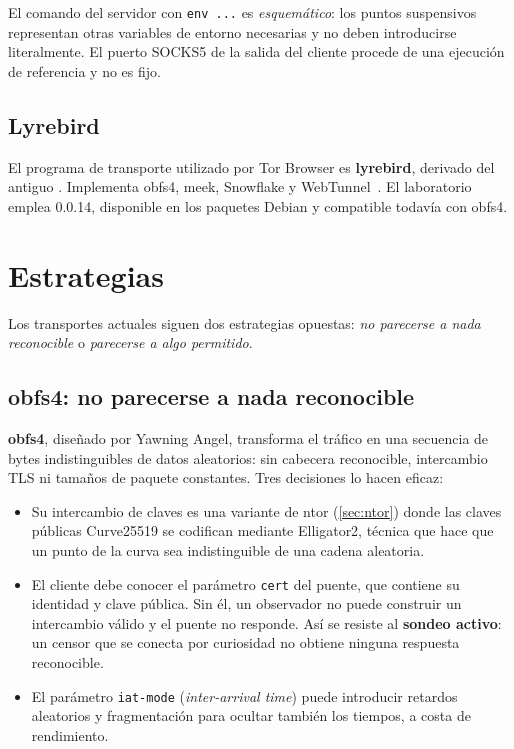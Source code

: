 El comando del servidor con \texttt{env ...} es \emph{esquemático}: los puntos suspensivos representan otras variables de entorno necesarias y no deben introducirse literalmente. El puerto SOCKS5 de la salida del cliente procede de una ejecución de referencia y no es fijo.

\subsection{Lyrebird}

El programa de transporte utilizado por Tor Browser es \textbf{lyrebird}, derivado del antiguo . Implementa obfs4, meek, Snowflake y WebTunnel~\cite{torsupport}. El laboratorio emplea  0.0.14, disponible en los paquetes Debian y compatible todavía con obfs4.

\section{Estrategias}\label{sec:cens-strategie}

Los transportes actuales siguen dos estrategias opuestas: \emph{no parecerse a nada reconocible} o \emph{parecerse a algo permitido}.

\subsection{obfs4: no parecerse a nada reconocible}

\textbf{obfs4}, diseñado por Yawning Angel, transforma el tráfico en una secuencia de bytes indistinguibles de datos aleatorios: sin cabecera reconocible, intercambio TLS ni tamaños de paquete constantes. Tres decisiones lo hacen eficaz:
\begin{itemize}
  \item Su intercambio de claves es una variante de ntor (\cref{sec:ntor}) donde las claves públicas Curve25519 se codifican mediante Elligator2, técnica que hace que un punto de la curva sea indistinguible de una cadena aleatoria.
  \item El cliente debe conocer el parámetro \texttt{cert} del puente, que contiene su identidad y clave pública. Sin él, un observador no puede construir un intercambio válido y el puente no responde. Así se resiste al \textbf{sondeo activo}: un censor que se conecta por curiosidad no obtiene ninguna respuesta reconocible.
  \item El parámetro \texttt{iat-mode} (\emph{inter-arrival time}) puede introducir retardos aleatorios y fragmentación para ocultar también los tiempos, a costa de rendimiento.
\end{itemize}

